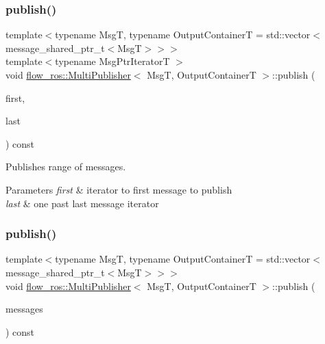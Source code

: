 \subsubsection{\texorpdfstring{publish()}{publish()}\hspace{0.1cm}{\footnotesize\ttfamily [1/2]}}
{\footnotesize\ttfamily template$<$typename MsgT, typename Output\+ContainerT = std\+::vector$<$message\+\_\+shared\+\_\+ptr\+\_\+t$<$\+Msg\+T$>$$>$$>$ \\
template$<$typename Msg\+Ptr\+IteratorT $>$ \\
void \hyperlink{classflow__ros_1_1_multi_publisher}{flow\+\_\+ros\+::\+Multi\+Publisher}$<$ MsgT, Output\+ContainerT $>$\+::publish (\begin{DoxyParamCaption}\item[{Msg\+Ptr\+IteratorT}]{first,  }\item[{const Msg\+Ptr\+IteratorT}]{last }\end{DoxyParamCaption}) const\hspace{0.3cm}{\ttfamily [inline]}}



Publishes range of messages. 


\begin{DoxyParams}{Parameters}
{\em first} & iterator to first message to publish \\
\hline
{\em last} & one past last message iterator \\
\hline
\end{DoxyParams}
\mbox{\label{classflow__ros_1_1_multi_publisher_adea00fbe1e1b566c9e374105325cbc6c}} 
\subsubsection{\texorpdfstring{publish()}{publish()}\hspace{0.1cm}{\footnotesize\ttfamily [2/2]}}
{\footnotesize\ttfamily template$<$typename MsgT, typename Output\+ContainerT = std\+::vector$<$message\+\_\+shared\+\_\+ptr\+\_\+t$<$\+Msg\+T$>$$>$$>$ \\
void \hyperlink{classflow__ros_1_1_multi_publisher}{flow\+\_\+ros\+::\+Multi\+Publisher}$<$ MsgT, Output\+ContainerT $>$\+::publish (\begin{DoxyParamCaption}\item[{const Output\+ContainerT \&}]{messages }\end{DoxyParamCaption}) const\hspace{0.3cm}{\ttfamily [inline]}}



